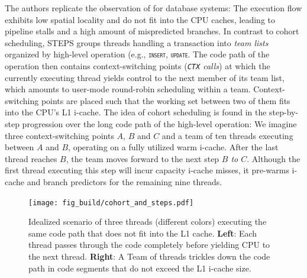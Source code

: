 \documentclass[12pt,a4paper]{book}
\begin{document}
The authors replicate the observation of \cite{cohort} for database systems:
The execution flow exhibits low spatial locality and do not fit into the CPU caches, leading to pipeline stalls and a high amount of mispredicted branches.
In contrast to cohort scheduling, STEPS groups threads handling a transaction into \emph{team lists} organized by high-level operation (e.g., \texttt{\textsc{insert}}, \texttt{\textsc{update}}.
The code path of the operation then contains context-switching points (\textit{\texttt{CTX} calls}) at which the currently executing thread yields control to the next member of its team list, which amounts to user-mode round-robin scheduling within a team.
Context-switching points are placed such that the working set between two of them fits into the CPU's L1 i-cache.
The idea of cohort scheduling is found in the step-by-step progression over the long code path of the high-level operation:
We imagine three context-switching points $A$, $B$ and $C$ and a team of ten threads executing between $A$ and $B$, operating on a fully utilized warm i-cache.
After the last thread reaches $B$, the team moves forward to the next step  \textit{$B$ to $C$}.
Although the first thread executing this step will incur capacity i-cache misses, it pre-warms i-cache and branch predictors for the remaining nine threads.~\cite{steps}

\begin{figure}[h]
    \centering
    \texttt{[image: fig\_build/cohort\_and\_steps.pdf]}
    \caption{
        Idealized scenario of three threads (different colors) executing the same code path that does not fit into the L1 cache.
        \textbf{Left}: Each thread passes through the code completely before yielding CPU to the next thread.
        \textbf{Right}: A Team of threads trickles down the code path in code segments that do not exceed the L1 i-cache size.
    }
    \label{fig:cohort_and_steps}
\end{figure}
\end{document}
